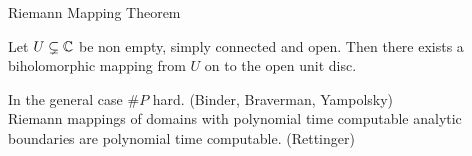 \begin{frame}[t]{Riemann Mapping Theorem}
  \begin{theorem}[Riemann]
    Let $U \subsetneq \mathbb{C}$ be non empty, simply connected and open.
    Then there exists a biholomorphic mapping from $U$ on to the open unit disc.
  \end{theorem}
  \pause
  In the general case $\#P$ hard. (Binder, Braverman, Yampolsky)\\
  Riemann mappings of domains with polynomial time computable analytic boundaries are polynomial time computable. (Rettinger)
\end{frame}
